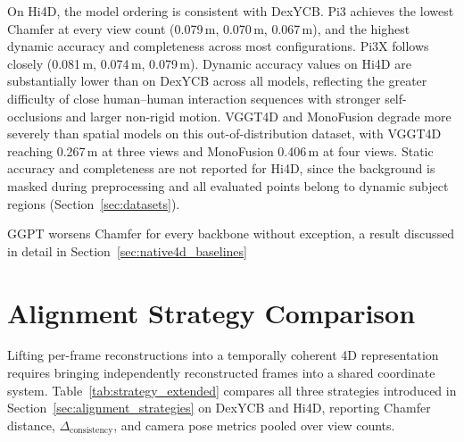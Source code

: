 On Hi4D, the model ordering is consistent with DexYCB. Pi3 achieves the lowest 
Chamfer at every view count (0.079\,m, 0.070\,m, 0.067\,m), and the highest 
dynamic accuracy and completeness across most configurations. Pi3X follows 
closely (0.081\,m, 0.074\,m, 0.079\,m). Dynamic accuracy values on Hi4D are 
substantially lower than on DexYCB across all models, reflecting the greater 
difficulty of close human--human interaction sequences with stronger 
self-occlusions and larger non-rigid motion. VGGT4D and MonoFusion degrade more 
severely than spatial models on this out-of-distribution dataset, with VGGT4D 
reaching 0.267\,m at three views and MonoFusion 0.406\,m at four views. Static 
accuracy and completeness are not reported for Hi4D, since the background is 
masked during preprocessing and all evaluated points belong to dynamic subject 
regions (Section~\ref{sec:datasets}).

GGPT worsens Chamfer for every backbone without exception, a result discussed 
in detail in Section~\ref{sec:native4d_baselines}

\section{Alignment Strategy Comparison}
\label{sec:alignment_comparison}

Lifting per-frame reconstructions into a temporally coherent 4D representation 
requires bringing independently reconstructed frames into a shared coordinate 
system. Table~\ref{tab:strategy_extended} compares all three strategies 
introduced in Section~\ref{sec:alignment_strategies} on DexYCB and Hi4D, 
reporting Chamfer distance, $\Delta_{\text{consistency}}$, and camera pose 
metrics pooled over view counts.

